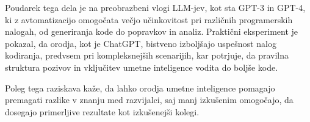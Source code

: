 \documentclass[a4paper,12pt,openright]{book}
\begin{document}
Poudarek tega dela je na preobrazbeni vlogi LLM-jev, kot sta GPT-3 in GPT-4, ki z avtomatizacijo omogočata večjo učinkovitost pri različnih programerskih nalogah, od generiranja kode do popravkov in analiz. Praktični eksperiment je pokazal, da orodja, kot je ChatGPT, bistveno izboljšajo uspešnost nalog kodiranja, predvsem pri kompleksnejših scenarijih, kar potrjuje, da pravilna struktura pozivov in vključitev umetne inteligence vodita do boljše kode.

Poleg tega raziskava kaže, da lahko orodja umetne inteligence pomagajo premagati razlike v znanju med razvijalci, saj manj izkušenim omogočajo, da dosegajo primerljive rezultate kot izkušenejši kolegi.

\printbibliography[heading=bibintoc,title={Literatura}]
\end{document}
